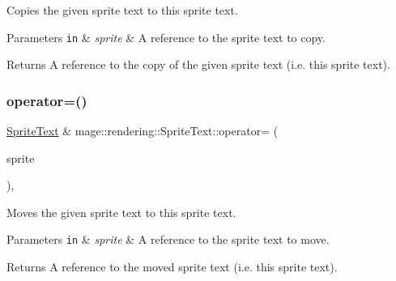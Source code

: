Copies the given sprite text to this sprite text.


\begin{DoxyParams}[1]{Parameters}
\mbox{\tt in}  & {\em sprite} & A reference to the sprite text to copy. \\
\hline
\end{DoxyParams}
\begin{DoxyReturn}{Returns}
A reference to the copy of the given sprite text (i.\+e. this sprite text). 
\end{DoxyReturn}
\hypertarget{classmage_1_1rendering_1_1_sprite_text_a8ced44509f1fa84236b20f1d42add873}{}\label{classmage_1_1rendering_1_1_sprite_text_a8ced44509f1fa84236b20f1d42add873} 
\subsubsection{\texorpdfstring{operator=()}{operator=()}\hspace{0.1cm}{\footnotesize\ttfamily [2/2]}}
{\footnotesize\ttfamily \hyperlink{classmage_1_1rendering_1_1_sprite_text}{Sprite\+Text} \& mage\+::rendering\+::\+Sprite\+Text\+::operator= (\begin{DoxyParamCaption}\item[{\hyperlink{classmage_1_1rendering_1_1_sprite_text}{Sprite\+Text} \&\&}]{sprite }\end{DoxyParamCaption})\hspace{0.3cm}{\ttfamily [default]}, {\ttfamily [noexcept]}}

Moves the given sprite text to this sprite text.


\begin{DoxyParams}[1]{Parameters}
\mbox{\tt in}  & {\em sprite} & A reference to the sprite text to move. \\
\hline
\end{DoxyParams}
\begin{DoxyReturn}{Returns}
A reference to the moved sprite text (i.\+e. this sprite text). 
\end{DoxyReturn}
\hypertarget{classmage_1_1rendering_1_1_sprite_text_acad93e0803d47502db5ef16998d2f38a}{}\label{classmage_1_1rendering_1_1_sprite_text_acad93e0803d47502db5ef16998d2f38a} 
